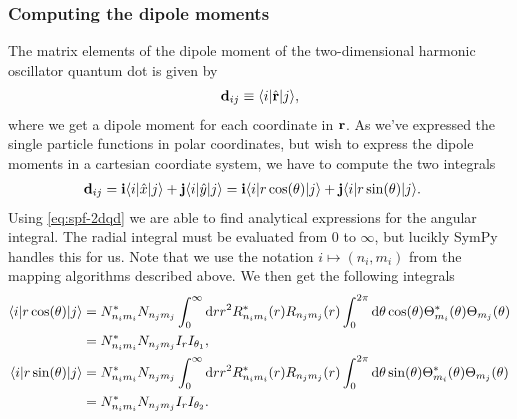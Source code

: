         \subsubsection{Computing the dipole moments}
            The matrix elements of the dipole moment of the two-dimensional
            harmonic oscillator quantum dot is given by
            \begin{align}
                \vf{d}_{ij}
                \equiv \bra{i}\position[\vf{r}]\ket{j},
            \end{align}
            where we get a dipole moment for each coordinate in $\vf{r}$. As
            we've expressed the single particle functions in polar coordinates,
            but wish to express the dipole moments in a cartesian coordiate
            system, we have to compute the two integrals
            \begin{align}
                \vf{d}_{ij}
                &= \vf{i}\bra{i} \position\ket{j}
                + \vf{j}\bra{i} \position[y]\ket{j}
                = \vf{i}\bra{i} r \cos(\theta)\ket{j}
                + \vf{j}\bra{i} r \sin(\theta)\ket{j}.
            \end{align}
            Using \autoref{eq:spf-2dqd} we are able to find analytical
            expressions for the angular integral. The radial integral must be
            evaluated from $0$ to $\infty$, but lucikly SymPy \cite{sympy}
            handles this for us. Note that we use the notation $i \mapsto (n_i,
            m_i)$ from the mapping algorithms described above. We then get the
            following integrals
            \begin{align}
                \bra{i} r \cos(\theta) \ket{j}
                &= N^{*}_{n_i m_i} N_{n_j m_j}
                \int_{0}^{\infty} \dd r r^2
                R_{n_i m_i}^{*}(r) R_{n_j m_j}(r)
                \int_{0}^{2\pi} \dd \theta \cos(\theta)
                \Theta_{m_i}^{*}(\theta) \Theta_{m_j}(\theta)
                \\
                &= N^{*}_{n_i m_i} N_{n_j m_j} I_{r} I_{\theta_1},
                \\
                \bra{i} r \sin(\theta) \ket{j}
                &= N^{*}_{n_i m_i} N_{n_j m_j}
                \int_{0}^{\infty} \dd r r^2
                R_{n_i m_i}^{*}(r) R_{n_j m_j}(r)
                \int_{0}^{2\pi} \dd \theta \sin(\theta)
                \Theta_{m_i}^{*}(\theta) \Theta_{m_j}(\theta)
                \\
                &= N^{*}_{n_i m_i} N_{n_j m_j} I_{r} I_{\theta_2}.
            \end{align}
